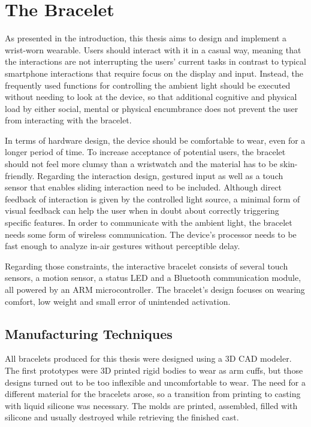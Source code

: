 \chapter{The Bracelet}
\label{chap:bracelet}
As presented in the introduction, this thesis aims to design and implement a wrist-worn wearable. Users should interact with it in a casual way, meaning that the interactions are not interrupting the users' current tasks in contrast to typical smartphone interactions that require focus on the display and input. Instead, the frequently used functions for controlling the ambient light should be executed without needing to look at the device, so that additional cognitive and physical load by either social, mental or physical encumbrance does not prevent the user from interacting with the bracelet.

In terms of hardware design, the device should be comfortable to wear, even for a longer period of time. To increase acceptance of potential users, the bracelet should not feel more clumsy than a wristwatch and the material has to be skin-friendly. Regarding the interaction design, gestured input as well as a touch sensor that enables sliding interaction need to be included. Although direct feedback of interaction is given by the controlled light source, a minimal form of visual feedback can help the user when in doubt about correctly triggering specific features. In order to communicate with the ambient light, the bracelet needs some form of wireless communication. The device's processor needs to be fast enough to analyze in-air gestures without perceptible delay.

Regarding those constraints, the interactive bracelet consists of several touch sensors, a motion sensor, a status \ac{LED} and a Bluetooth communication module, all powered by an ARM microcontroller. The bracelet's design focuses on wearing comfort, low weight and small error of unintended activation.

\section{Manufacturing Techniques}

All bracelets produced for this thesis were designed using a 3D \linebreak\ac{CAD} modeler. The first prototypes were 3D printed rigid bodies to wear as arm cuffs, but those designs turned out to be too inflexible and uncomfortable to wear. The need for a different material for the bracelets arose, so a transition from printing to casting with liquid silicone was necessary. The molds are printed, assembled, filled with silicone and usually destroyed while retrieving the finished cast.

